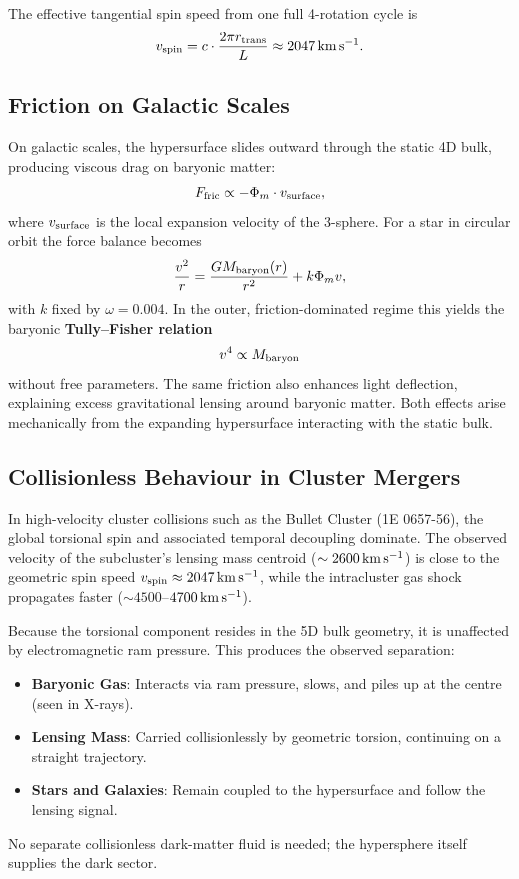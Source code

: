 \documentclass[11pt,a4paper]{article}
\begin{document}
The effective tangential spin speed from one full 4-rotation cycle is
\[
v_{\rm spin} = c \cdot \frac{2\pi r_{\rm trans}}{L} \approx 2047\,\rm km\,s^{-1}.
\]

\subsection{Friction on Galactic Scales}

On galactic scales, the hypersurface slides outward through the static 4D bulk, producing viscous drag on baryonic matter:
\[
F_{\rm fric} \propto -\Phi_m \cdot v_{\rm surface},
\]
where $v_{\rm surface}$ is the local expansion velocity of the 3-sphere. For a star in circular orbit the force balance becomes
\[
\frac{v^2}{r} = \frac{GM_{\rm baryon}(r)}{r^2} + k\Phi_m v,
\]
with $k$ fixed by $\omega = 0.004$. In the outer, friction-dominated regime this yields the baryonic \textbf{Tully--Fisher relation}
\[
v^4 \propto M_{\rm baryon}
\]
without free parameters. The same friction also enhances light deflection, explaining excess gravitational lensing around baryonic matter. Both effects arise mechanically from the expanding hypersurface interacting with the static bulk.

\subsection{Collisionless Behaviour in Cluster Mergers}

In high-velocity cluster collisions such as the Bullet Cluster (1E 0657-56), the global torsional spin and associated temporal decoupling dominate. The observed velocity of the subcluster’s lensing mass centroid ($\sim 2600\,\rm km\,s^{-1}$) is close to the geometric spin speed $v_{\rm spin} \approx 2047\,\rm km\,s^{-1}$, while the intracluster gas shock propagates faster ($\sim 4500$--$4700\,\rm km\,s^{-1}$).

Because the torsional component resides in the 5D bulk geometry, it is unaffected by electromagnetic ram pressure. This produces the observed separation:
\begin{itemize}
    \item \textbf{Baryonic Gas}: Interacts via ram pressure, slows, and piles up at the centre (seen in X-rays).
    \item \textbf{Lensing Mass}: Carried collisionlessly by geometric torsion, continuing on a straight trajectory.
    \item \textbf{Stars and Galaxies}: Remain coupled to the hypersurface and follow the lensing signal.
\end{itemize}
No separate collisionless dark-matter fluid is needed; the hypersphere itself supplies the dark sector.
\end{document}
